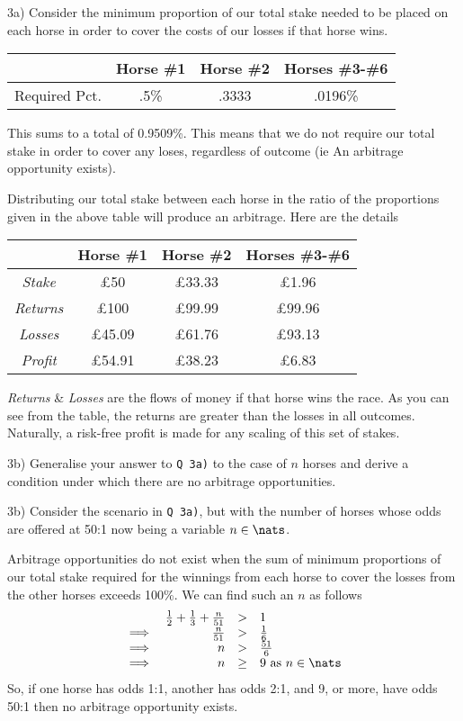\documentclass[11pt,a4paper]{article}
\begin{document}
\begin{answer}{3a)}
  Consider the minimum proportion of our total stake needed to be placed on each horse in order to cover the costs of our losses if that horse wins.
  \begin{center}
    \begin{tabular}{c|c|c|c}
      &Horse \#1&Horse \#2&Horses \#3-\#6\\\hline
      Required Pct.&.5\%&.3333&.0196\%
    \end{tabular}
  \end{center}
  This sums to a total of 0.9509\%. This means that we do not require our total stake in order to cover any loses, regardless of outcome (ie An arbitrage opportunity exists).
  \par Distributing our total stake between each horse in the ratio of the proportions given in the above table will produce an arbitrage. Here are the details
  \begin{center}
    \begin{tabular}{c|c|c|c}
      &Horse \#1&Horse \#2&Horses \#3-\#6\\\hline
      \textit{Stake}&£50&£33.33&£1.96\\\hline
      \textit{Returns}&£100&£99.99&£99.96\\
      \textit{Losses}&£45.09&£61.76&£93.13\\\hline
      \textit{Profit}&£54.91&£38.23&£6.83\\\hline
    \end{tabular}
  \end{center}
  \par \textit{Returns} \& \textit{Losses} are the flows of money if that horse wins the race. As you can see from the table, the returns are greater than the losses in all outcomes. Naturally, a risk-free profit is made for any scaling of this set of stakes.
\end{answer}

\begin{question}{3b)}
  Generalise your answer to \texttt{Q 3a)} to the case of $n$ horses and derive a condition under which there are no arbitrage opportunities.
\end{question}

\begin{answer}{3b)}
  Consider the scenario in \texttt{Q 3a)}, but with the number of horses whose odds are offered at 50:1 now being a variable $n\in\nats$.
  \par Arbitrage opportunities do not exist when the sum of minimum proportions of our total stake required for the winnings from each horse to cover the losses from the other horses exceeds 100\%. We can find such an $n$ as follows
  \[\begin{array}{rrcl}
    &\frac12+\frac13+\frac{n}{51}&>&1\\
    \implies&\frac{n}{51}&>&\frac16\\
    \implies&n&>&\frac{51}6\\
    \implies&n&\geq&9\text{ as }n\in\nats
  \end{array}\]
  So, if one horse has odds 1:1, another has odds 2:1, and 9, or more, have odds 50:1 then no arbitrage opportunity exists.
\end{answer}
\end{document}
